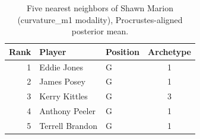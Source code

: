 \begin{table}[htbp]
  \centering\small
  \begin{tabular}{rllc}
    \toprule
    Rank & Player & Position & Archetype \\
    \midrule
    1 & Eddie Jones & G & 1 \\
    2 & James Posey & G & 1 \\
    3 & Kerry Kittles & G & 3 \\
    4 & Anthony Peeler & G & 1 \\
    5 & Terrell Brandon & G & 1 \\
    \bottomrule
  \end{tabular}
  \caption{Five nearest neighbors of Shawn Marion (curvature_m1 modality), Procrustes-aligned posterior mean.}
  \label{tab:Shawn_Marion_neighbors_curvature_m1}
\end{table}

